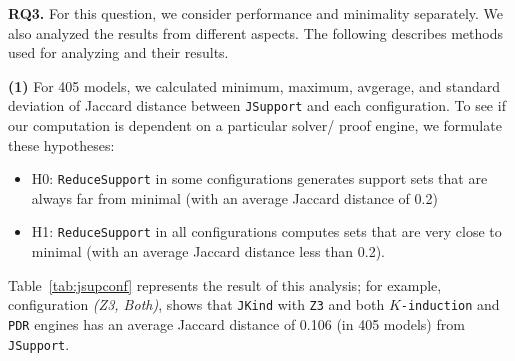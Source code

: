 %
%
\vspace{6pt}
\noindent{}
 \vspace{6pt}

\textbf{RQ3.}   For this question, we consider performance and minimality separately.  We also analyzed the results from different aspects. The following describes methods used for analyzing and their results.

\textbf{(1)} For 405 models, we calculated minimum, maximum, avgerage, and standard deviation of Jaccard distance between \texttt{JSupport} and each configuration. To see if our computation is dependent on a particular solver/ proof engine, we formulate these hypotheses:
\begin{itemize}
  \item H0: \texttt{ReduceSupport} in some configurations generates support sets that are always far from minimal (with an average Jaccard distance of 0.2)
  \item H1: \texttt{ReduceSupport} in all configurations computes sets that are very close to minimal (with an average Jaccard distance less than 0.2).
\end{itemize}

Table~\ref{tab:jsupconf} represents the result of this analysis; for example, configuration \emph{(Z3, Both)}, shows that \texttt{\texttt{JKind}} with \texttt{Z3} and both \texttt{$K$-induction} and \texttt{PDR} engines has an average Jaccard distance of 0.106 (in 405 models) from \texttt{JSupport}.


